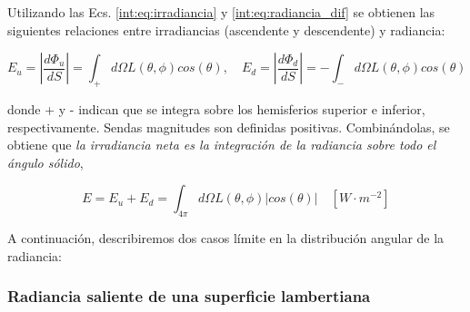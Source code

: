         Utilizando las Ecs. \ref{int:eq:irradiancia} y \ref{int:eq:radiancia_dif} se obtienen las siguientes relaciones entre irradiancias (ascendente y descendente) y radiancia:

        \begin{equation}
        E_{u}=\left|\frac{d\Phi_{u}}{dS}\right|=\int_{+}d\Omega L(\theta,\phi)cos(\theta),\quad  E_{d}=\left|\frac{d\Phi_{d}}{dS}\right|= - \int_{-}d\Omega L(\theta,\phi)cos(\theta)
        \label{int:eq:rad_irrad1}
        \end{equation}
        
        \noindent donde + y - indican que se integra sobre los hemisferios superior e inferior, respectivamente. Sendas magnitudes son definidas positivas. Combinándolas, se obtiene que \textit{la irradiancia neta es la integración de la radiancia sobre todo el ángulo sólido},
        
        \begin{equation}
         E=E_{u} + E_{d}=\int_{4\pi}d\Omega L(\theta,\phi)|cos(\theta)|\quad [W\cdot m^{-2}]
        \label{int:eq:rad_irrad2}
         \end{equation}
        

        
        
        
        A continuación, describiremos dos casos límite en la distribución angular de la radiancia: 

        \subsubsection{Radiancia saliente de una superficie lambertiana}
        \label{int:s:lambertiana}
        
